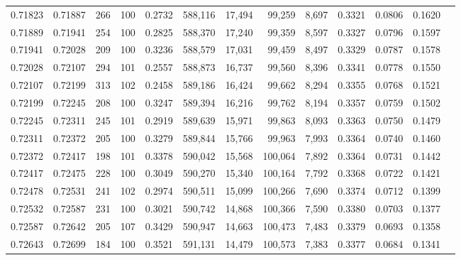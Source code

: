 \begin{tabular}{rrrrrrrrrrrrr}
0.71823 & 0.71887 &   266 & 100 &                                     0.2732 & 588,116 &  17,494 &  99,259 &   8,697 & 0.3321 & 0.0806 & 0.1620 \\
0.71889 & 0.71941 &   254 & 100 &                                     0.2825 & 588,370 &  17,240 &  99,359 &   8,597 & 0.3327 & 0.0796 & 0.1597 \\
0.71941 & 0.72028 &   209 & 100 &                                     0.3236 & 588,579 &  17,031 &  99,459 &   8,497 & 0.3329 & 0.0787 & 0.1578 \\
0.72028 & 0.72107 &   294 & 101 &                                     0.2557 & 588,873 &  16,737 &  99,560 &   8,396 & 0.3341 & 0.0778 & 0.1550 \\
0.72107 & 0.72199 &   313 & 102 &                                     0.2458 & 589,186 &  16,424 &  99,662 &   8,294 & 0.3355 & 0.0768 & 0.1521 \\
0.72199 & 0.72245 &   208 & 100 &                                     0.3247 & 589,394 &  16,216 &  99,762 &   8,194 & 0.3357 & 0.0759 & 0.1502 \\
0.72245 & 0.72311 &   245 & 101 &                                     0.2919 & 589,639 &  15,971 &  99,863 &   8,093 & 0.3363 & 0.0750 & 0.1479 \\
0.72311 & 0.72372 &   205 & 100 &                                     0.3279 & 589,844 &  15,766 &  99,963 &   7,993 & 0.3364 & 0.0740 & 0.1460 \\
0.72372 & 0.72417 &   198 & 101 &                                     0.3378 & 590,042 &  15,568 & 100,064 &   7,892 & 0.3364 & 0.0731 & 0.1442 \\
0.72417 & 0.72475 &   228 & 100 &                                     0.3049 & 590,270 &  15,340 & 100,164 &   7,792 & 0.3368 & 0.0722 & 0.1421 \\
0.72478 & 0.72531 &   241 & 102 &                                     0.2974 & 590,511 &  15,099 & 100,266 &   7,690 & 0.3374 & 0.0712 & 0.1399 \\
0.72532 & 0.72587 &   231 & 100 &                                     0.3021 & 590,742 &  14,868 & 100,366 &   7,590 & 0.3380 & 0.0703 & 0.1377 \\
0.72587 & 0.72642 &   205 & 107 &                                     0.3429 & 590,947 &  14,663 & 100,473 &   7,483 & 0.3379 & 0.0693 & 0.1358 \\
0.72643 & 0.72699 &   184 & 100 &                                     0.3521 & 591,131 &  14,479 & 100,573 &   7,383 & 0.3377 & 0.0684 & 0.1341 \\

\end{tabular}
